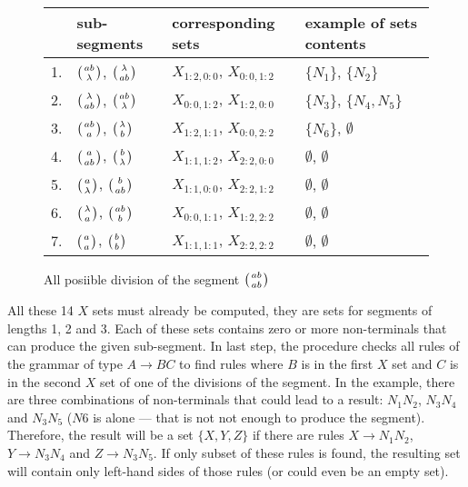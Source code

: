 \begin{figure}[H]
  \caption{All posiible division of the segment $\wkpair{ab}{ab}$}
  \centering
  \label{tab:segment_divisions}
\begin{tabular}{ |l|l|l|l|  }
  \hline
   & sub-segments & corresponding sets  & example of sets contents \\
  \hline
  1. & $\wkpair{ab}{\lambda}$, $\wkpair{\lambda}{ab}$ & $X_{1:2,0:0}$, $X_{0:0,1:2}$ & $\{N_1\}$, $\{N_2\}$ \\ [1ex]
  2. & $\wkpair{\lambda}{ab}$, $\wkpair{ab}{\lambda}$ & $X_{0:0,1:2}$, $X_{1:2,0:0}$ & $\{N_3\}$, $\{N_4, N_5\}$ \\ [1ex]
  3. & $\wkpair{ab}{a}$, $\wkpair{\lambda}{b}$ & $X_{1:2,1:1}$, $X_{0:0,2:2}$ & $\{N_6\}$, $\emptyset$ \\ [1ex]
  4. & $\wkpair{a}{ab}$, $\wkpair{b}{\lambda}$ & $X_{1:1,1:2}$, $X_{2:2,0:0}$ & $\emptyset$, $\emptyset$ \\ [1ex]
  5. & $\wkpair{a}{\lambda}$, $\wkpair{b}{ab}$ & $X_{1:1,0:0}$, $X_{2:2,1:2}$ & $\emptyset$, $\emptyset$ \\ [1ex]
  6. & $\wkpair{\lambda}{a}$, $\wkpair{ab}{b}$ & $X_{0:0,1:1}$, $X_{1:2,2:2}$ & $\emptyset$, $\emptyset$ \\ [1ex]
  7. & $\wkpair{a}{a}$, $\wkpair{b}{b}$ & $X_{1:1,1:1}$, $X_{2:2,2:2}$ & $\emptyset$, $\emptyset$ \\ [1ex]
  \hline
\end{tabular}
\end{figure}


All these 14 $X$ sets must already be computed, they are sets for segments of lengths 1, 2 and 3. Each of these sets contains zero or more non-terminals that can produce the given sub-segment. In last step, the procedure checks all rules of the grammar of type $A \rightarrow BC$ to find rules where $B$ is in the first $X$ set and $C$ is in the second $X$ set of one of the divisions of the segment. In the example, there are three combinations of non-terminals that could lead to a result: $N_1N_2$, $N_3N_4$ and $N_3N_5$ ($N6$ is alone --- that is not not enough to produce the segment). Therefore, the result will be a set $\{X, Y, Z\}$ if there are rules $X \rightarrow N_1N_2$, $Y \rightarrow N_3N_4$ and $Z \rightarrow N_3N_5$. If only subset of these rules is found, the resulting set will contain only left-hand sides of those rules (or could even be an empty set).



